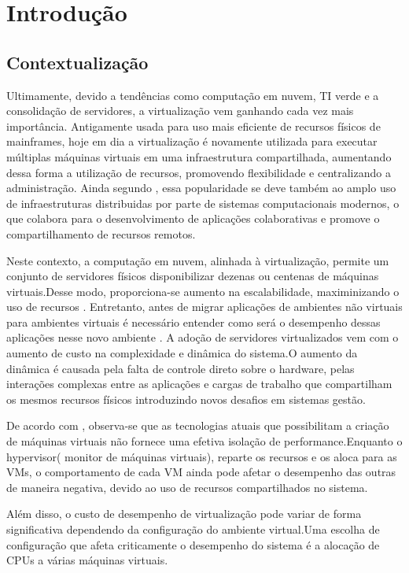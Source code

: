 \chapter{Introdução}
\section{Contextualizaç\~ao}
Ultimamente, devido a tendências como computação em nuvem, TI verde e a consolidação de servidores, a virtualização vem ganhando cada vez mais importância. Antigamente usada para uso mais eficiente de recursos físicos de mainframes, hoje em dia a virtualização é novamente utilizada para executar múltiplas máquinas virtuais em uma infraestrutura compartilhada, aumentando dessa forma a utilização de recursos, promovendo flexibilidade e centralizando a administração\cite{huber2011}. Ainda segundo , essa popularidade se deve também ao amplo uso de infraestruturas distribuidas por parte de sistemas computacionais modernos, o que colabora para o desenvolvimento de aplicações colaborativas e promove o compartilhamento de recursos remotos.

Neste contexto, a computação em nuvem, alinhada à virtualização, permite um conjunto de servidores físicos disponibilizar dezenas ou centenas de máquinas virtuais.Desse modo, proporciona-se aumento na escalabilidade, maximinizando o uso de recursos \cite{popiolek2012}. Entretanto, antes de migrar aplicações de ambientes não virtuais para ambientes virtuais é necessário entender como será o desempenho dessas aplicações nesse novo ambiente \cite{benevuto2006}. A adoção de servidores virtualizados vem com o aumento de custo na complexidade e dinâmica do sistema.O aumento da dinâmica é causada pela falta de controle direto sobre o hardware, pelas interações complexas entre as aplicações e cargas de trabalho que compartilham os mesmos recursos físicos introduzindo novos desafios em sistemas gestão\cite{huber2011}.

De acordo com , observa-se que as tecnologias atuais que possibilitam a criação de máquinas virtuais não fornece uma efetiva isolação de performance.Enquanto o hypervisor( monitor de máquinas virtuais), reparte os recursos e os aloca para as VMs, o comportamento de cada VM ainda pode afetar o desempenho das outras de maneira negativa, devido ao uso de recursos compartilhados no sistema.  

Além disso, o custo de desempenho de virtualização pode variar de forma significativa dependendo da configuração do ambiente virtual.Uma escolha de configuração que afeta criticamente o desempenho do sistema é a alocação de CPUs a várias máquinas virtuais\cite{benevuto2006}.

